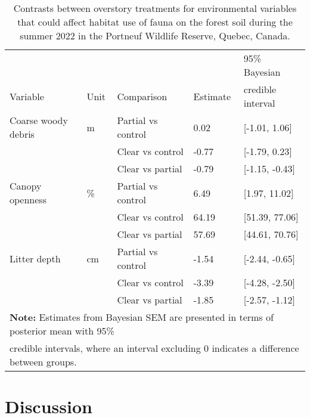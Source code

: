\begin{table}[ht]
  \centering
  \caption[Contrasts between overstory treatments for environmental variables that could affect habitat selection of fauna on the forest soil.]
  {Contrasts between overstory treatments for environmental variables that could affect habitat use of fauna on the forest soil during the summer 2022 in the Portneuf Wildlife Reserve,
  Quebec, Canada.}
  \label{tab:overstoryenvar}
  \begin{tabular}{lllll} 
      \hline
      &&&&95\% Bayesian \\
      Variable&Unit& Comparison & Estimate &  credible interval \\ [0.5ex] 
      \hline
      Coarse woody debris &m\up{3}& Partial vs control & \hspace{1mm}0.02 & [-1.01, 1.06] \\ 
                 && Clear vs control  & -0.77 & [-1.79, 0.23] \\ 
                          && Clear vs partial  & -0.79 & [-1.15, -0.43] \\
      Canopy openness     &\%& Partial vs control & \hspace{1mm}6.49 & [1.97, 11.02] \\ 
                      && Clear vs control  & \hspace{1mm}64.19 & [51.39, 77.06] \\ 
                          && Clear vs partial  & \hspace{1mm}57.69 & [44.61, 70.76] \\ 
      Litter depth        &cm& Partial vs control & -1.54 & [-2.44, -0.65] \\ 
                      && Clear vs control  & -3.39 & [-4.28, -2.50] \\ 
                          && Clear vs partial  & -1.85 & [-2.57, -1.12] \\       
      \hline
      \multicolumn{5}{l}{\textbf{Note:} Estimates from Bayesian SEM are presented in terms of posterior mean with 95\%} \\
      \multicolumn{5}{l}{credible intervals, where an interval excluding 0 indicates a difference between groups.} \\
  \end{tabular}
\end{table}




\clearpage

\section*{Discussion}
\label{sec:discu1}

